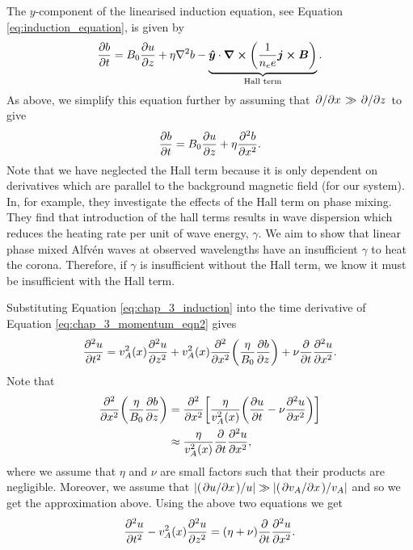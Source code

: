The $y$-component of the linearised induction equation, see Equation \eqref{eq:induction_equation}, is given by
\begin{equation}
    \pdv{b}{t} = B_0\pdv{u}{z}+\eta\nabla^2 b - \underbrace{\boldsymbol{\hat{y}}\cdot\curl(\frac{1}{n_e e}\boldsymbol{j}\cross\boldsymbol{B})}_{\text{Hall term}}.
\end{equation}
As above, we simplify this equation further by assuming that $\pdv*{}{x}\gg\pdv*{}{z}$ to give 
\begin{equation}
    \label{eq:chap_3_induction}
    \pdv{b}{t} = B_0\pdv{u}{z}+\eta\pdv[2]{b}{x}.
\end{equation}
Note that we have neglected the Hall term because it is only dependent on derivatives which are parallel to the background magnetic field (for our system). In, for example, \citet{Threlfall2017} they investigate the effects of the Hall term on phase mixing. They find that introduction of the hall terms results in wave dispersion which reduces the heating rate per unit of wave energy, $\gamma$. We aim to show that linear phase mixed Alfv\'en waves at observed wavelengths have an insufficient $\gamma$ to heat the corona. Therefore, if $\gamma$ is insufficient without the Hall term, we know it must be insufficient with the Hall term.

Substituting Equation \eqref{eq:chap_3_induction} into the time derivative of Equation \eqref{eq:chap_3_momentum_eqn2} gives
\[\pdv[2]{u}{t}=v_A^2(x)\pdv[2]{u}{z}+v_A^2(x)\pdv[2]{}{x}\qty(\frac{\eta}{B_0}\pdv{b}{z})+\nu\pdv{}{t}\pdv[2]{u}{x}.\]
Note that
\[\begin{aligned}
\pdv[2]{}{x}\qty(\frac{\eta}{B_0}\pdv{b}{z}) &= \pdv[2]{}{x}\qty[\frac{\eta}{v_A^2(x)}\qty(\pdv{u}{t} - \nu \pdv[2]{u}{x})] \\
&\approx \frac{\eta}{v_A^2(x)}\pdv{}{t}\pdv[2]{u}{x},
\end{aligned}\]
where we assume that $\eta$ and $\nu$ are small factors such that their products are negligible. Moreover, we assume that $\abs{(\pdv*{u}{x})/u}\gg\abs{(\pdv*{v_A}{x})/v_A}$ and so we get the approximation above. Using the above two equations we get
\begin{equation}
    \label{eq:wave_diffusion_equation}
    \pdv[2]{u}{t}-v_A^2(x)\pdv[2]{u}{z}= (\eta+\nu)\pdv{}{t}\pdv[2]{u}{x}.
\end{equation}

